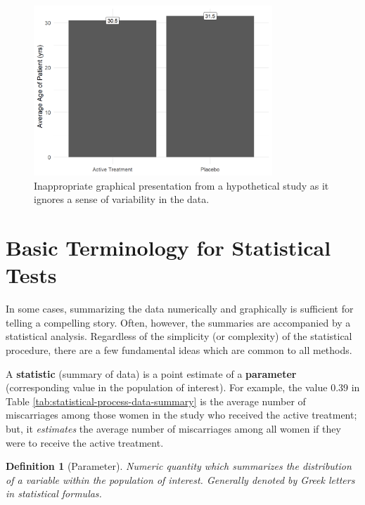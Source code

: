 \documentclass[
]{book}
\theoremstyle{plain}
\theoremstyle{mydefn}
\newtheorem{definition}{Definition}[chapter]
\theoremstyle{myexmpl}
\theoremstyle{remark}
\begin{document}
\begin{figure}

{\centering \includegraphics[width=0.8\textwidth]{./Images/statistical-process-poor-graphics-1} 

}

\caption{Inappropriate graphical presentation from a hypothetical study as it ignores a sense of variability in the data.}\label{fig:statistical-process-poor-graphics}
\end{figure}

\hypertarget{basic-terminology-for-statistical-tests}{%
\section{Basic Terminology for Statistical Tests}\label{basic-terminology-for-statistical-tests}}

In some cases, summarizing the data numerically and graphically is sufficient for telling a compelling story. Often, however, the summaries are accompanied by a statistical analysis. Regardless of the simplicity (or complexity) of the statistical procedure, there are a few fundamental ideas which are common to all methods.

A \textbf{statistic} (summary of data) is a point estimate of a \textbf{parameter} (corresponding value in the population of interest). For example, the value 0.39 in Table \ref{tab:statistical-process-data-summary} is the average number of miscarriages among those women in the study who received the active treatment; but, it \emph{estimates} the average number of miscarriages among all women if they were to receive the active treatment.

\begin{definition}[Parameter]
Numeric quantity which summarizes the distribution of a variable within the \emph{population} of interest. Generally denoted by Greek letters in statistical formulas.
\end{definition}
\end{document}
